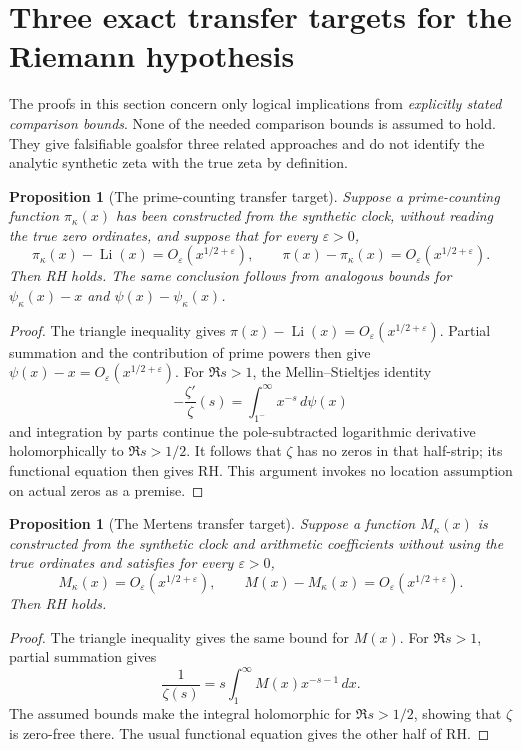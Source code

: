 \documentclass[11pt,reqno]{amsart}
\numberwithin{equation}{section}
\newtheorem{proposition}[theorem]{Proposition}
\begin{document}
\section{Three exact transfer targets for the Riemann hypothesis}
\label{sec:RHtransfers}
The proofs in this section concern only logical implications from
\emph{explicitly stated comparison bounds}. None of the needed
comparison bounds is assumed to hold. They give falsifiable goalsfor three related approaches and do not identify the analytic
synthetic zeta with the true zeta by definition.

\begin{proposition}[The prime-counting transfer target]
\label{prop:piRHtarget}
Suppose a prime-counting function $\pi_\kappa(x)$ has been
constructed from the synthetic clock, \emph{without reading the
true zero ordinates}, and suppose that for every $\varepsilon>0$,
\[
\pi_\kappa(x)-\operatorname{Li}(x)=O_\varepsilon(x^{1/2+\varepsilon}),
\qquad
\pi(x)-\pi_\kappa(x)=O_\varepsilon(x^{1/2+\varepsilon}).
\]
Then RH holds. The same conclusion follows from analogous
bounds for $\psi_\kappa(x)-x$ and $\psi(x)-\psi_\kappa(x)$.
\end{proposition}
\begin{proof}
The triangle inequality gives
$\pi(x)-\operatorname{Li}(x)=O_\varepsilon(x^{1/2+\varepsilon})$.
Partial summation and the contribution of prime powers then give
$\psi(x)-x=O_\varepsilon(x^{1/2+\varepsilon})$.
For $\Re s>1$, the Mellin--Stieltjes identity
\[
-\frac{\zeta'}\zeta(s)=\int_{1^-}^\infty x^{-s}\,d\psi(x)
\]
and integration by parts continue the pole-subtracted logarithmic
derivative holomorphically to $\Re s>1/2$.
It follows that $\zeta$ has no zeros in that half-strip;
its functional equation then gives RH. This argument invokes no
location assumption on actual zeros as a premise.
\end{proof}

\begin{proposition}[The Mertens transfer target]
\label{prop:MRHtarget}
Suppose a function $M_\kappa(x)$ is constructed from the
synthetic clock and arithmetic coefficients without using the
true ordinates and satisfies for every $\varepsilon>0$,
\[
M_\kappa(x)=O_\varepsilon(x^{1/2+\varepsilon}),\qquad
M(x)-M_\kappa(x)=O_\varepsilon(x^{1/2+\varepsilon}).
\]
Then RH holds.
\end{proposition}
\begin{proof}
The triangle inequality gives the same bound for $M(x)$.
For $\Re s>1$, partial summation gives
\[
\frac1{\zeta(s)}=s\int_1^\infty M(x)x^{-s-1}\,dx.
\]
The assumed bounds make the integral holomorphic for
$\Re s>1/2$, showing that $\zeta$ is zero-free there.
The usual functional equation gives the other half of RH.
\end{proof}
\end{document}
